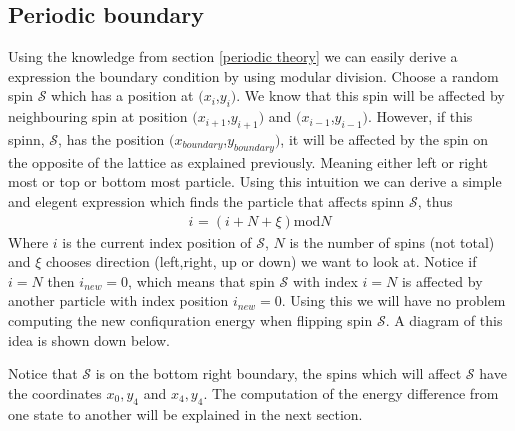 \documentclass[a4paper, 10pt]{article}
\begin{document}
\subsection{Periodic boundary \label{periodic method}} Using the knowledge from section \eqref{periodic theory} we can easily derive a
expression the boundary condition by using modular division. Choose a random spin $\mathcal{S}$ which has a position
at $(x_{i}$,$y_{i})$. We know that this spin will be affected by neighbouring spin at position $(x_{i+1}$,$y_{i+1})$
and $(x_{i-1}$,$y_{i-1})$. However, if this spinn, $\mathcal{S}$, has the position $(x_{boundary}$,$y_{boundary})$,
it will be affected by the spin on the opposite of the lattice as explained previously. Meaning either left or right most or top or bottom most particle.
Using this intuition we can derive a simple and elegent expression which finds the particle that affects spinn
$\mathcal{S}$, thus
\begin{align}
  i_{} = (i + N + \xi)\mathrm{mod} N
\end{align}
Where $i$ is the current index position of $\mathcal{S}$, $N$ is the number of spins (not total) and $\xi$ chooses direction (left,right, up or down) we want to look at.
Notice if $i = N$ then $i_{new} = 0$, which means that spin $\mathcal{S}$ with index $i = N$ is affected by another particle with index position
$i_{new} = 0$. Using this we will have no problem computing the new confiquration energy when flipping spin
$\mathcal{S}$. A diagram of this idea is shown down below.
\begin{center}
\end{center}
 Notice that $\mathcal{S}$ is on the bottom right boundary,
 the spins which will affect $\mathcal{S}$ have the coordinates $x_{0},y_{4}$ and
 $x_{4},y_{4}$. The computation of the energy difference from one state to another
will be explained in the next section.
\end{document}
